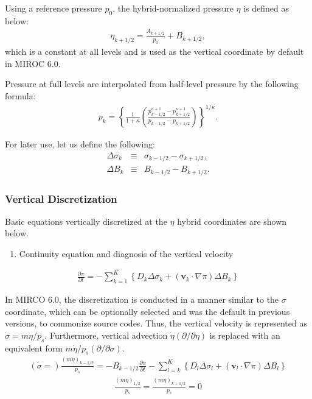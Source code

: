 Using a reference pressure \(p_0\), the hybrid-normalized pressure \(\eta\) is defined as below:
\begin{eqnarray}
\eta_{k+1/2} = \frac{A_{k+1/2}}{p_0} +B_{k+1/2},
\end{eqnarray}
which is a constant at all levels and is used as the vertical coordinate by default in MIROC 6.0.

Pressure at full levels are interpolated from half-level pressure by the following formula:
\begin{eqnarray}
 p_k = \left\{ \frac{1}{1+\kappa}
                     \left( \frac{  p^{\kappa +1}_{k-1/2}
                                  - p^{\kappa +1}_{k+1/2}      }
                                  { p_{k-1/2} - p_{k+1/2} }
                     \right)
              \right\}^{1/\kappa}.
\end{eqnarray}

For later use, let us define the following:
\begin{eqnarray}
  \Delta\sigma_k &\equiv & \sigma_{k-1/2} - \sigma_{k+1/2}, \\
  \Delta B_k &\equiv & B_{k-1/2} - B_{k+1/2}.
\end{eqnarray}

\hypertarget{vertical-discretization-1}{%
\subsubsection{Vertical
Discretization}\label{vertical-discretization-1}}

Basic equations vertically discretized at the $\eta$ hybrid coordinates are shown below.

\begin{enumerate}
\def\labelenumi{\arabic{enumi}.}
\tightlist
\item
  Continuity equation and diagnosis of the vertical velocity
\end{enumerate}
\begin{eqnarray}
  \frac{\partial \pi}{\partial t}
 = - \sum_{k=1}^{K} \left\{ D_k \Delta\sigma_k + ({\mathbf{v}}_k \cdot \nabla \pi)\Delta B_k \right\}
\end{eqnarray}

In MIRCO 6.0, the discretization is conducted in a manner similar to the $\sigma$ coordinate,
which can be optionally selected and was the default in previous versions, to commonize source codes.
Thus, the vertical velocity is represented as \(\dot{\sigma}=m\dot{\eta}/p_s\).
Furthermore, vertical advection \(\dot{\eta}(\partial/\partial\eta)\) is replaced with an equivalent form \(m\dot{\eta}/p_s(\partial/\partial\sigma)\).
\begin{eqnarray}
  \left(\dot{\sigma}=\right)\frac{(m\dot{\eta})_{k-1/2}}{p_s}
 = - B_{k-1/2} \frac{\partial \pi}{\partial t}
   - \sum_{l=k}^{K}\left\{ D_l \Delta\sigma_l + ({\mathbf{v}}_l \cdot \nabla \pi)\Delta B_l \right\}
\end{eqnarray}
\begin{eqnarray}
  \frac{(m\dot{\eta})_{1/2}}{p_s} = \frac{(m\dot{\eta})_{k+1/2}}{p_s} = 0
\end{eqnarray}

